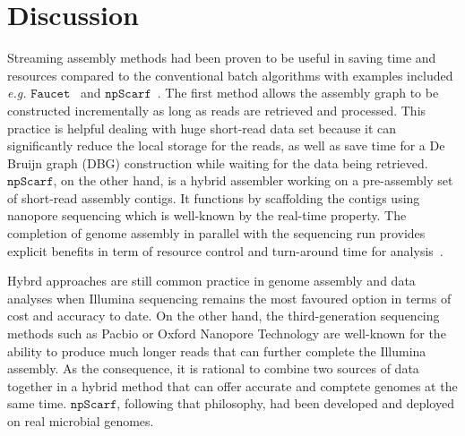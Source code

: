\documentclass[10pt,twocolumn,twoside]{genpaper}
\newcommand{\npscarf}{$\mathtt{npScarf}$}
\newcommand{\npgraph}{$\mathtt{npGraph}$}
\newcommand{\EG}{\emph{e.g.}}
\begin{document}
%

\section*{Discussion}

Streaming assembly methods had been proven to be useful in saving time and resources compared to the conventional batch algorithms with examples included \EG{} $\mathtt{Faucet}$~\cite{Rozov2017faucet} and \npscarf{}~\cite{Cao2017scaffolding}. The first method allows the assembly graph to be constructed incrementally as long as reads are retrieved and processed. This practice is helpful dealing with huge short-read data set because it can significantly reduce the local storage for the reads, as well as save time for a De Bruijn graph (DBG) construction while waiting for the data being retrieved.
\npscarf{}, on the other hand, is a hybrid assembler working on a pre-assembly set of short-read assembly contigs. It functions by scaffolding the contigs using nanopore sequencing which is well-known by the real-time property. The completion of genome assembly in parallel with the sequencing run provides explicit benefits in term of resource control and turn-around time for analysis~\cite{Cao2017scaffolding}.  

Hybrd approaches are still common practice in genome assembly and data analyses when Illumina sequencing remains the most favoured option in terms of cost and accuracy to date.
On the other hand, the third-generation sequencing methods such as Pacbio or Oxford Nanopore Technology are well-known for the ability to produce much longer reads that can further complete the Illumina assembly.
As the consequence, it is rational to combine two sources of data together in a hybrid method that can offer accurate and comptete genomes at the same time.
\npscarf{}, following that philosophy, had been developed and deployed on real microbial genomes.
\end{document}
